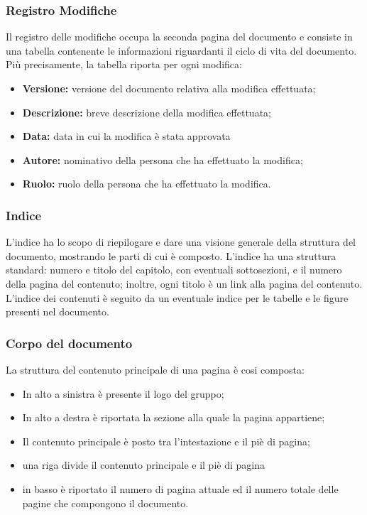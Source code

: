 \subsubsection{Registro Modifiche}
Il registro delle modifiche occupa la seconda pagina del documento e consiste in una tabella contenente le informazioni riguardanti il ciclo di vita del documento.
\\Più precisamente, la tabella riporta per ogni modifica: 
\begin{itemize}
\item \textbf{Versione:} versione del documento relativa alla modifica effettuata;
	\item \textbf{Descrizione:} breve descrizione della modifica effettuata;
		\item \textbf{Data:} data in cui la modifica è stata approvata
			\item \textbf{Autore:} nominativo della persona che ha effettuato la modifica; 
				\item \textbf{Ruolo:} ruolo della persona che ha effettuato la modifica. 
\end{itemize}
\subsubsection{Indice}
L'indice ha lo scopo di riepilogare e dare una visione generale della struttura del documento, mostrando le parti di cui è composto. L'indice ha una struttura standard: numero e titolo del capitolo, con eventuali sottosezioni, e il numero della pagina del contenuto; inoltre, ogni titolo è un link alla pagina del contenuto. L'indice dei contenuti è seguito da un eventuale indice per le tabelle e le figure presenti nel documento.
\subsubsection{Corpo del documento}
La struttura del contenuto principale di una pagina è cosi composta:
\begin{itemize}
\item In alto a sinistra è presente il logo del gruppo;
	\item In alto a destra è riportata la sezione alla quale la pagina appartiene;
		\item Il contenuto principale è posto tra l'intestazione e il piè di pagina;
			\item una riga divide il contenuto principale e il piè di pagina
				\item in basso è riportato il numero di pagina attuale ed il numero totale delle pagine che compongono il documento.
\end{itemize}
